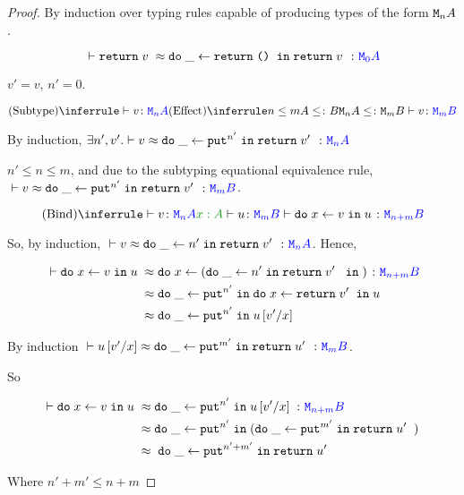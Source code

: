 \documentclass{Report}
\begin{document}
\begin{proof}
    By induction over typing rules capable of producing types of the form $\texttt{M}_{n}{A}$.


    $$\zberelation{\return{v}}{\doin{\_}{\return{\u}}{\return{v}}}{\M{0}{A}}$$

    $v' = v$, $n' = 0$.


    \begin{equation}
        \ntreeruleII{Subtype}{\ztyperelation{v}{\mna}}{\subeffecttree{n}{A}{m}{B}}{\ztyperelation{v}{\mmb}}
    \end{equation}

    By induction, $\exists n', v'. \zberelation{v}{\doin{\_}{\put^{n'}}{\return{v'}}}{\mna}$

    $n' \leq n \leq m$, and due to the subtyping equational equivalence rule, $\zberelation{v}{\doin{\_}{\put^{n'}}{\return{v'}}}{\mmb}$.


    
    $$\ntreeruleII{Bind}{\ztyperelation{v}{\mna}}{\typerelation{x: A}{u}{\mmb}}{\ztyperelation{\doin{x}{v}{u}}{\M{n+m}{B}}}$$

    So, by induction, $\zberelation{v}{\doin{\_}{n'}{\return{v'}}}{\mna}$. Hence,


    \begin{align}
        \zberelation{\doin{x}{v}{u}}{&\s\doin{x}{(\doin{\_}{n'}{\return{v'}}})}{\M{n+m}{B}}\\
        \beequiv&\s\doin{\_}{\put^{n'}}{\doin{x}{\return{v'}}{u}}\\
        \beequiv&\s \doin{\_}{\put^{n'}}{u\ssub{x}{v'}}
    \end{align}

    By induction $\zberelation{u\ssub{x}{v'}}{\doin{\_}{\put^{m'}}{\return{u'}}}{\mmb}$.

    So

    \begin{align}
        \zberelation{\doin{x}{v}{u}}{&\s\doin{\_}{\put^{n'}}{u\ssub{x}{v'}}}{\M{n+m}{B}} \\
        \beequiv & \s\doin{\_}{\put^{n'}}{(\doin{\_}{\put^{m'}}{\return{u'}})}\\
        \beequiv &\s \s\doin{\_}{\put^{n'+m'}}{\return{u'}}
    \end{align}

    Where $n' + m'\leq n+m$
    
    


\end{proof}
\end{document}
